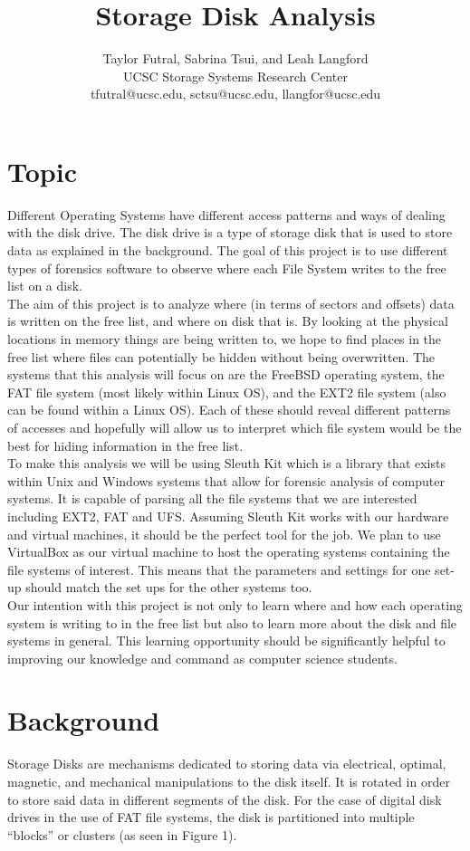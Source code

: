 \documentclass[a4paper]{article}
\title{Storage Disk Analysis}
\author{Taylor Futral, Sabrina Tsui, and Leah Langford\\ 
UCSC Storage Systems Research Center\\ 
tfutral@ucsc.edu, sctsu@ucsc.edu, llangfor@ucsc.edu}
\begin{document}
\maketitle

\section{Topic}
Different Operating Systems have different access patterns and ways of dealing with the disk drive. The disk drive is a type of storage disk that is used to store data as explained in the background. The goal of this project is to use different types of forensics software to observe where each File System writes to the free list on a disk.\\  
\indent The aim of this project is to analyze where (in terms of sectors and offsets) data is written on the free list, and where on disk that is. By looking at the physical locations in memory things are being written to, we hope to find places in the free list where files can potentially be hidden without being overwritten. The systems that this analysis will focus on are the FreeBSD operating system, the FAT file system (most likely within Linux OS), and the EXT2 file system (also can be found within a Linux OS). Each of these should reveal different patterns of accesses and hopefully will allow us to interpret which file system would be the best for hiding information in the free list.\\
\indent To make this analysis we will be using Sleuth Kit which is a library that exists within Unix and Windows systems that allow for forensic analysis of computer systems. It is capable of parsing all the file systems that we are interested including EXT2, FAT and UFS. Assuming Sleuth Kit works with our hardware and virtual machines, it should be the perfect tool for the job. We plan to use VirtualBox as our virtual machine to host the operating systems containing the file systems of interest. This means that the parameters and settings for one set-up should match the set ups for the other systems too.\\
\indent Our intention with this project is not only to learn where and how each operating system is writing to in the free list but also to learn more about the disk and file systems in general. This learning opportunity should be significantly helpful to improving our knowledge and command as computer science students.

\section{Background}
Storage Disks are mechanisms dedicated to storing data via electrical, optimal, magnetic, and mechanical manipulations to the disk itself. It is rotated in order to store said data in different segments of the disk. For the case of digital disk drives in the use of FAT file systems, the disk is partitioned into multiple “blocks” or clusters (as seen in Figure 1). 
\end{document}
